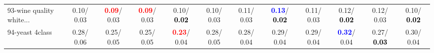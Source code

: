 \begin{table}[h]
\begin{center}
{\begin{tabular}{lc|c|c|c|c|c|c|c|c|c|c}
93-wine quality white... &   0.10/  0.03 & \textcolor{red}{\textbf{  0.09}}/  0.03 & \textcolor{red}{\textbf{  0.09}}/  0.03 &   0.10/\textcolor{black}{\textbf{  0.02}} &   0.10/  0.03 &   0.11/  0.03 & \textcolor{blue}{\textbf{  0.13}}/\textcolor{black}{\textbf{  0.02}} &   0.11/  0.03 &   0.12/\textcolor{black}{\textbf{  0.02}} &   0.12/  0.03 &   0.10/\textcolor{black}{\textbf{  0.02}} \\
94-yeast 4class &   0.28/  0.06 &   0.25/  0.05 &   0.25/  0.05 & \textcolor{red}{\textbf{  0.23}}/  0.04 &   0.28/  0.05 &   0.28/  0.04 &   0.29/  0.04 &   0.29/  0.04 & \textcolor{blue}{\textbf{  0.32}}/  0.04 &   0.27/\textcolor{black}{\textbf{  0.03}} &   0.30/  0.04 \\\end{tabular}
}\label{strats2b5NN}
\end{center}
\end{table}
                                     